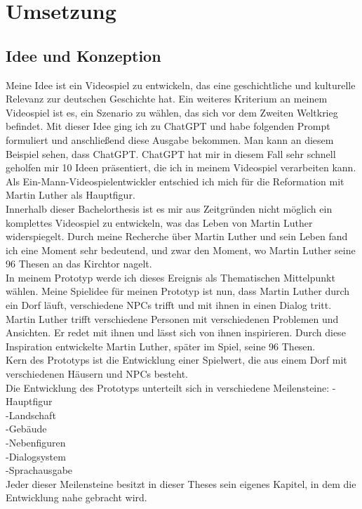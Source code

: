 \documentclass[12pt,a4paper,bibliography=totocnumbered,listof=totocnumbered]{scrartcl}
\begin{document}
\section{Umsetzung}
\subsection {Idee und Konzeption}
Meine Idee ist ein Videospiel zu entwickeln, das eine geschichtliche und kulturelle Relevanz zur deutschen Geschichte hat. Ein weiteres Kriterium an meinem Videospiel ist es, ein Szenario zu wählen, das sich vor dem Zweiten Weltkrieg befindet. Mit dieser Idee ging ich zu ChatGPT und habe folgenden Prompt formuliert und anschließend diese Ausgabe bekommen.
Man kann an diesem Beispiel sehen, dass ChatGPT. ChatGPT hat mir in diesem Fall sehr schnell geholfen mir 10 Ideen präsentiert, die ich in meinem Videospiel verarbeiten kann.
Als Ein-Mann-Videospielentwickler entschied ich mich für die Reformation mit Martin Luther als Hauptfigur.
\\
Innerhalb dieser Bachelorthesis ist es mir aus Zeitgründen nicht möglich ein komplettes Videospiel zu entwickeln, was das Leben von Martin Luther widerspiegelt. Durch meine Recherche über Martin Luther und sein Leben fand ich eine Moment sehr bedeutend, und zwar den Moment, wo Martin Luther seine 96 Thesen an das Kirchtor nagelt.
\\
In meinem Prototyp werde ich dieses Ereignis als Thematischen Mittelpunkt wählen. 
Meine Spielidee für meinen Prototyp ist nun, dass Martin Luther durch ein Dorf läuft, verschiedene NPCs trifft und mit ihnen in einen Dialog tritt. Martin Luther trifft verschiedene Personen mit verschiedenen Problemen und Ansichten. Er redet mit ihnen und lässt sich von ihnen inspirieren. Durch diese Inspiration entwickelte Martin Luther, später im Spiel, seine 96 Thesen. 
\\
Kern des Prototyps ist die Entwicklung einer Spielwert, die aus einem Dorf mit verschiedenen Häusern und NPCs besteht. 
\\
Die Entwicklung des Prototyps unterteilt sich in verschiedene Meilensteine:
-Hauptfigur
\\
-Landschaft
\\
-Gebäude
\\
-Nebenfiguren
\\
-Dialogsystem
\\
-Sprachausgabe
\\
Jeder dieser Meilensteine besitzt in dieser Theses sein eigenes Kapitel, in dem die Entwicklung nahe gebracht wird.
\end{document}
